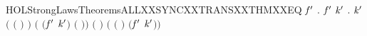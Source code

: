 \newcommand{\HOLStrongLawsTheoremsALLXXSYNCXXTRANSXXTHM}{\UseVerbatim{HOLStrongLawsTheoremsALLXXSYNCXXTRANSXXTHM}}
\begin{SaveVerbatim}{HOLStrongLawsTheoremsALLXXSYNCXXTRANSXXTHMXXEQ}
\HOLTokenTurnstile{} \HOLSymConst{\HOLTokenForall{}}   \ensuremath{\HOLBoundVar{f}\sp{\prime}}  .
          \ensuremath{\HOLBoundVar{f}\sp{\prime}}  \HOLTokenTransBegin{}\HOLTokenTransEnd {} \HOLSymConst{\HOLTokenEquiv{}}
       \HOLSymConst{\HOLTokenExists{}} \ensuremath{\HOLBoundVar{k}\sp{\prime}} .
            \HOLSymConst{\HOLTokenLeq{}}  \HOLSymConst{\HOLTokenConj{}} \ensuremath{\HOLBoundVar{k}\sp{\prime}} \HOLSymConst{\HOLTokenLeq{}}  \HOLSymConst{\HOLTokenConj{}} \ensuremath{(} \ensuremath{(} \ensuremath{)} \HOLSymConst{\ensuremath{=}}  \ensuremath{)} \HOLSymConst{\HOLTokenConj{}}
           \ensuremath{(} \ensuremath{(}\ensuremath{\HOLBoundVar{f}\sp{\prime}} \ensuremath{\HOLBoundVar{k}\sp{\prime}}\ensuremath{)} \HOLSymConst{\ensuremath{=}}  \ensuremath{(} \ensuremath{)}\ensuremath{)} \HOLSymConst{\HOLTokenConj{}} \ensuremath{(} \HOLSymConst{\ensuremath{=}} \HOLConst{\ensuremath{\tau}}\ensuremath{)} \HOLSymConst{\HOLTokenConj{}}
           \ensuremath{(} \HOLSymConst{\ensuremath{=}}  \ensuremath{(} \ensuremath{)} \HOLSymConst{\ensuremath{\mid}}  \ensuremath{(}\ensuremath{\HOLBoundVar{f}\sp{\prime}} \ensuremath{\HOLBoundVar{k}\sp{\prime}}\ensuremath{)}\ensuremath{)}
\end{SaveVerbatim}
\newcommand{\HOLStrongLawsTheoremsALLXXSYNCXXTRANSXXTHMXXEQ}{\UseVerbatim{HOLStrongLawsTheoremsALLXXSYNCXXTRANSXXTHMXXEQ}}

